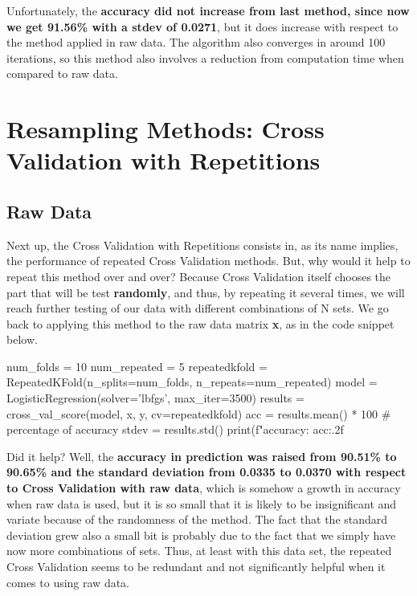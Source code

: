 \documentclass[11pt]{article}
\begin{document}
Unfortunately, the \textbf{accuracy did not increase from last method, since now we get 91.56\% with a stdev of 0.0271}, but it does increase with respect to the method applied in raw data. The algorithm also converges in around 100 iterations, so this method also involves a reduction from computation time when compared to raw data.

\section{Resampling Methods: Cross Validation with Repetitions}

\subsection{Raw Data}

Next up, the Cross Validation with Repetitions consists in, as its name implies, the performance of repeated Cross Validation methods. But, why would it help to repeat this method over and over? Because Cross Validation itself chooses the part that will be test \textbf{randomly}, and thus, by repeating it several times, we will reach further testing of our data with different combinations of N sets. We go back to applying this method to the raw data matrix \textbf{x}, as in the code snippet below.
\\

\begin{python}
num_folds = 10
num_repeated = 5
repeatedkfold = RepeatedKFold(n_splits=num_folds, n_repeats=num_repeated)
model = LogisticRegression(solver='lbfgs', max_iter=3500)
results = cross_val_score(model, x, y, cv=repeatedkfold)
acc = results.mean() * 100 # percentage of accuracy
stdev = results.std()
print(f"accuracy: {acc:.2f}%
\end{python}

Did it help? Well, the \textbf{accuracy in prediction was raised from 90.51\% to 90.65\% and the standard deviation from 0.0335 to 0.0370 with respect to Cross Validation with raw data}, which is somehow a growth in accuracy when raw data is used, but it is so small that it is likely to be insignificant and variate because of the randomness of the method. The fact that the standard deviation grew also a small bit is probably due to the fact that we simply have now more combinations of sets. Thus, at least with this data set, the repeated Cross Validation seems to be redundant and not significantly helpful when it comes to using raw data.
\end{document}
